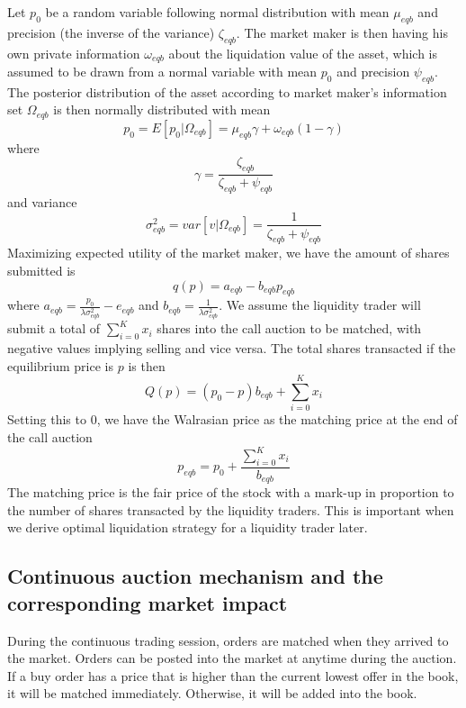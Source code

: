 \documentclass{article}
\begin{document}
Let $p_0$ be a random variable following normal distribution with mean $\mu_{eqb}$ and precision (the inverse of the variance) $\zeta_{eqb}$. The market maker is then having his own private information $\omega_{eqb}$ about the liquidation value of the asset, which is assumed to be drawn from a normal variable with mean $p_0$ and precision $\psi_{eqb}$. The posterior distribution of the asset according to market maker's information set $\Omega_{eqb}$ is then normally distributed with mean
\[
  p_0=E[p_0|\Omega_{eqb}]=\mu_{eqb} \gamma + \omega_{eqb}(1 - \gamma)
\]
where
\[
  \gamma = \frac{\zeta_{eqb}}{\zeta_{eqb}+\psi_{eqb}}
\]
and variance
\[
  \sigma_{eqb}^2=var[v|\Omega_{eqb}]=\frac{1}{\zeta_{eqb}+\psi_{eqb}}
\]
Maximizing expected utility of the market maker, we have the amount of shares submitted is
\[
  q(p) = a_{eqb} - b_{eqb} p_{eqb}
\]
where $a_{eqb} = \frac{p_0}{\lambda \sigma_{eqb}^2} - e_{eqb}$ and $b_{eqb}=\frac{1}{\lambda \sigma_{eqb}^2}$. We assume the liquidity trader will submit a total of $\sum_{i=0}^K x_i$ shares into the call auction to be matched, with negative values implying selling and vice versa. The total shares transacted if the equilibrium price is $p$ is then
\[
  Q(p) = (p_0 - p) b_{eqb} + \sum_{i=0}^K x_i
\]
Setting this to 0, we have the Walrasian price as the matching price at the end of the call auction
\begin{equation}\label{markup_px_eqb}
  p_{eqb} = p_0 + \frac{\sum_{i=0}^K x_i}{b_{eqb}}
\end{equation}
The matching price is the fair price of the stock with a mark-up in proportion to the number of shares transacted by the liquidity traders. This is important when we derive optimal liquidation strategy for a liquidity trader later.

\subsection{Continuous auction mechanism and the corresponding market impact}
During the continuous trading session, orders are matched when they arrived to the market. Orders can be posted into the market at anytime during the auction. If a buy order has a price that is higher than the current lowest offer in the book, it will be matched immediately. Otherwise, it will be added into the book.
\end{document}

